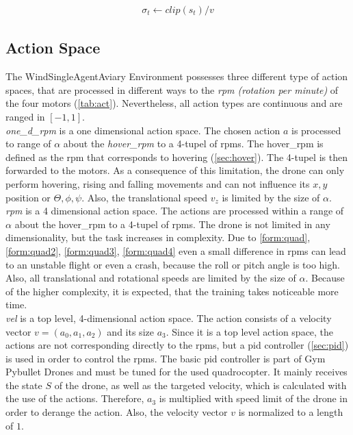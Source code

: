 \newline
\begin{align}
	\sigma_t \leftarrow clip(s_t) / v \label{eq:clipnorm}
\end{align}
\newline

\newpage

\subsection{Action Space}
The WindSingleAgentAviary Environment possesses three different type of action spaces, that are processed in different ways to the \emph{rpm (rotation per minute)} of the four motors (\cref{tab:act}). Nevertheless, all action types are continuous and are ranged in $[-1, 1]$.\\
\newline
\emph{one\_d\_rpm} is a one dimensional action space. The chosen action $a$ is processed to range of $\alpha$ about the \emph{hover\_rpm} to a 4-tupel of rpms. The hover\_rpm is defined as the rpm that corresponds to hovering (\cref{sec:hover}). The 4-tupel is then forwarded to the motors. As a consequence of this limitation, the drone can only perform hovering, rising and falling movements and can not influence its $x,y$ position or $\Theta, \phi, \psi$. Also, the translational speed $v_z$ is limited by the size of $\alpha$.\\
\newline
\emph{rpm} is a 4 dimensional action space. The actions are processed within a range of $\alpha$ about the hover\_rpm to a 4-tupel of rpms. The drone is not limited in any dimensionality, but the task increases in complexity. Due to \cref{form:quad}, \cref{form:quad2}, \cref{form:quad3}, \cref{form:quad4} even a small difference in rpms can lead to an unstable flight or even a crash, because the roll or pitch angle is too high. Also, all translational and rotational speeds are limited by the size of $\alpha$. Because of the higher complexity, it is expected, that the training takes noticeable more time.\\
\newline
\emph{vel} is a top level, 4-dimensional action space. The action consists of a velocity vector $v = (a_0, a_1, a_2)$ and its size $a_3$.  Since it is a top level action space, the actions are not corresponding directly to the rpms, but a pid controller (\cref{sec:pid}) is used in order to control the rpms. The basic pid controller is part of Gym Pybullet Drones \cite{panerati2021learning} and must be tuned for the used quadrocopter. It mainly receives the state $S$ of the drone, as well as the targeted velocity, which is calculated with the use of the actions. Therefore, $a_3$ is multiplied with speed limit of the drone in order to derange the action. Also, the velocity vector $v$ is normalized to a length of $1$.\\
